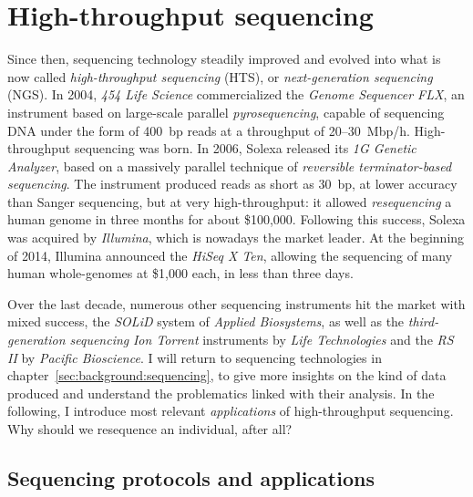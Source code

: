 
\section{High-throughput sequencing}

Since then, sequencing technology steadily improved and evolved into what is now called \emph{high-throughput sequencing} (HTS), or \emph{next-generation sequencing} (NGS).
In 2004, \emph{454 Life Science} commercialized the \emph{Genome Sequencer FLX}, an instrument based on large-scale parallel \emph{pyrosequencing}, capable of sequencing DNA under the form of 400~bp reads at a throughput of 20--30~Mbp/h.
High-throughput sequencing was born.
In 2006, Solexa released its \emph{1G Genetic Analyzer}, based on a massively parallel technique of \emph{reversible terminator-based sequencing}.
The instrument produced reads as short as 30~bp, at lower accuracy than Sanger sequencing, but at very high-throughput: it allowed \emph{resequencing} a human genome in three months for about \$100,000.
Following this success, Solexa was acquired by \emph{Illumina}, which is nowadays the market leader.
At the beginning of 2014, Illumina announced the \emph{HiSeq X Ten}, allowing the sequencing of many human whole-genomes at \$1,000 each, in less than three days.

Over the last decade, numerous other sequencing instruments hit the market with mixed success, \eg the \emph{SOLiD} system of \emph{Applied Biosystems}, as well as the \emph{third-generation sequencing} \emph{Ion Torrent} instruments by \emph{Life Technologies} and the \emph{RS II} by \emph{Pacific Bioscience}.
I will return to sequencing technologies in chapter~\ref{sec:background:sequencing}, to give more insights on the kind of data produced and understand the problematics linked with their analysis.
In the following, I introduce most relevant \emph{applications} of high-throughput sequencing.
Why should we resequence an individual, after all?

\subsection{Sequencing protocols and applications}


